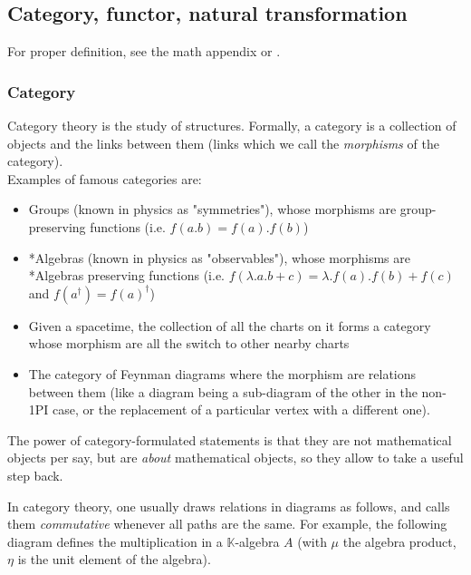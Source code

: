 \documentclass[a4paper,11pt]{article}
\numberwithin{equation}{section}
\theoremstyle{definition}
\begin{document}
    \subsection{Category, functor, natural transformation} \label{AnPhCat}
    For proper definition, see the math appendix or \cite{AlgLang}.
        \subsubsection{Category}
    Category theory is the study of structures. Formally, a category is a collection of objects and the links between them (links which we call the \emph{morphisms} of the category).\\
    Examples of famous categories are:
    \begin{itemize}
        \item Groups (known in physics as "symmetries"), whose morphisms are group-preserving functions (i.e. $f(a.b)=f(a).f(b)$)
        \item *Algebras (known in physics as "observables"), whose morphisms are *Algebras preserving functions (i.e. $f(\lambda.a.b+c)=\lambda.f(a).f(b)+f(c)$ and $f(a^\dag)=f(a)^\dag$)
        \item Given a spacetime, the collection of all the charts on it forms a category whose morphism are all the switch to other nearby charts
        \item The category of Feynman diagrams where the morphism are relations between them (like a diagram being a sub-diagram of the other in the non-1PI case, or the replacement of a particular vertex with a different one).
    \end{itemize}
    The power of category-formulated statements is that they are not mathematical objects per say, but are \emph{about} mathematical objects, so they allow to take a useful step back.
    
    In category theory, one usually draws relations in diagrams as follows, and calls them \emph{commutative} whenever all paths are the same. For example, the following diagram defines the multiplication in a $\mathbb{K}$-algebra $A$ (with $\mu$ the algebra product, $\eta$ is the unit element of the algebra).\\
    
\end{document}
